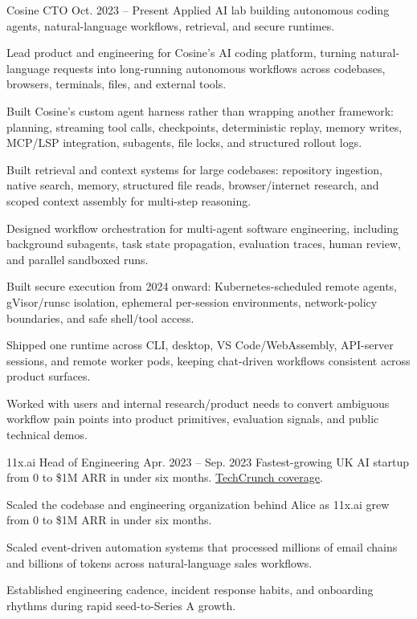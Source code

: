 
\ResumeJob
  {Cosine}
  {CTO}
  {Oct. 2023 -- Present}
  {Applied AI lab building autonomous coding agents, natural-language workflows, retrieval, and secure runtimes.}
\begin{ResumeList}
  \item Lead product and engineering for Cosine's AI coding platform, turning natural-language requests into long-running autonomous workflows across codebases, browsers, terminals, files, and external tools.
  \item Built Cosine's custom agent harness rather than wrapping another framework: planning, streaming tool calls, checkpoints, deterministic replay, memory writes, MCP/LSP integration, subagents, file locks, and structured rollout logs.
  \item Built retrieval and context systems for large codebases: repository ingestion, native search, memory, structured file reads, browser/internet research, and scoped context assembly for multi-step reasoning.
  \item Designed workflow orchestration for multi-agent software engineering, including background subagents, task state propagation, evaluation traces, human review, and parallel sandboxed runs.
  \item Built secure execution from 2024 onward: Kubernetes-scheduled remote agents, gVisor/runsc isolation, ephemeral per-session environments, network-policy boundaries, and safe shell/tool access.
  \item Shipped one runtime across CLI, desktop, VS Code/WebAssembly, API-server sessions, and remote worker pods, keeping chat-driven workflows consistent across product surfaces.
  \item Worked with users and internal research/product needs to convert ambiguous workflow pain points into product primitives, evaluation signals, and public technical demos.
\end{ResumeList}

\ResumeJob
  {11x.ai}
  {Head of Engineering}
  {Apr. 2023 -- Sep. 2023}
  {Fastest-growing UK AI startup from 0 to \$1M ARR in under six months. \href{https://techcrunch.com/2023/08/11/11xai-closes-2-million-pre-seed-to-create-autonomous-ai-workers/}{TechCrunch coverage}.}
\begin{ResumeList}
  \item Scaled the codebase and engineering organization behind Alice as 11x.ai grew from 0 to \$1M ARR in under six months.
  \item Scaled event-driven automation systems that processed millions of email chains and billions of tokens across natural-language sales workflows.
  \item Established engineering cadence, incident response habits, and onboarding rhythms during rapid seed-to-Series A growth.
\end{ResumeList}

